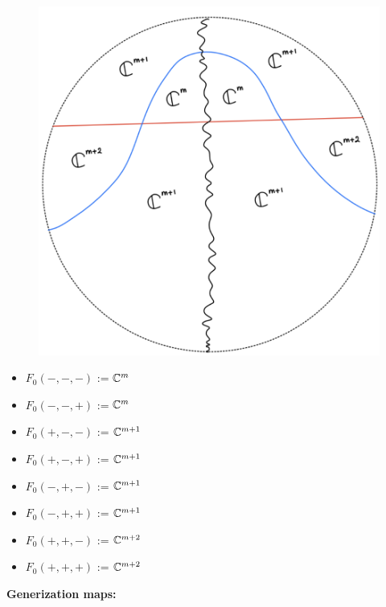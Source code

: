 \begin{figure}[H]
    \centering
    \includegraphics[scale = 0.45]{diagrams/lemma3/20.png} 
    \caption{}
    \label{fig:your-label}
\end{figure}
\begin{itemize}
\item $F_0(-,-,-)$ := $\mathbb{C}^m$
\item $F_0(-,-,+)$ := $\mathbb{C}^m$
\item $F_0(+,-,-)$ := $\mathbb{C}^{m+1}$
\item $F_0(+,-,+)$ := $\mathbb{C}^{m+1}$
\item $F_0(-,+,-)$ := $\mathbb{C}^{m+1}$
\item $F_0(-,+,+)$ := $\mathbb{C}^{m+1}$
\item $F_0(+,+,-)$ := $\mathbb{C}^{m+2}$
\item $F_0(+,+,+)$ := $\mathbb{C}^{m+2}$
\end{itemize}
\textbf{Generization maps:}
